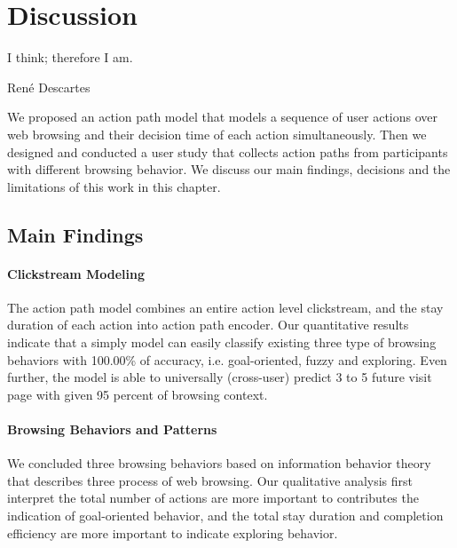 \section{Discussion}
\label{ch:discuss}

\epigraph{I think; therefore I am.}{Ren\'e Descartes}

We proposed an action path model that models a sequence of user actions over web browsing
and their decision time of each action simultaneously.
Then we designed and conducted a user study that collects action paths
from participants with different browsing behavior.
We discuss our main findings, decisions and the limitations of this work in this chapter.

\subsection{Main Findings}

\paragraph{Clickstream Modeling}

The action path model combines an entire action level clickstream, 
and the stay duration of each action into action path encoder.
Our quantitative results indicate that 
a simply model can easily classify existing three type of browsing
behaviors with 100.00\% of accuracy, i.e. goal-oriented, fuzzy and exploring.
Even further, the model is able to universally (cross-user) predict 3 to 5 future visit 
page with given 95 percent of browsing context.

\paragraph{Browsing Behaviors and Patterns}

We concluded three browsing behaviors based on information behavior theory that describes
three process of web browsing.
Our qualitative analysis 
first interpret the total number of actions 
are more important to contributes the indication of goal-oriented behavior,
and the total stay duration and completion efficiency are more important to indicate exploring behavior.

